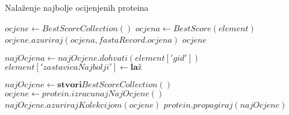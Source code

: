 \begin{algorithm}[h!]
\centering
\caption{Nalaženje najbolje ocijenjenih proteina}
\label{algo:best-score}
\begin{algorithmic}[1]
    \State $ocjene \gets BestScoreCollection()$
            \State $ocjena \gets BestScore(element)$
            \State $ocjene.azuriraj(ocjena, fastaRecord.ocjena)$
        \EndFor
    \EndFor        
    \State \Return $ocjene$
\EndFunction

            \State $najOcjena \gets najOcjene.dohvati( element['gid'] )$
                \State $element['zastavicaNajbolji'] \gets \textbf{laž}$ %
            \EndIf
        \EndFor
    \EndFor
\EndFunction

    \State $najOcjene \gets \textbf{stvori} BestScoreCollection()$
        \State $ocjene \gets protein.izracunajNajOcjene()$
        \State $najOcjene.azurirajKolekcijom( ocjene )$
    \EndFor
        \State $protein.propagiraj(najOcjene)$
    \EndFor
\EndFunction
\end{algorithmic}
\end{algorithm}
